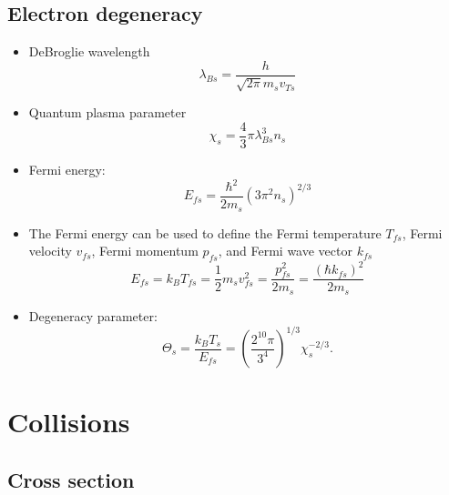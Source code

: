 \documentclass[a4paper,11pt]{report}
\begin{document}
\section{Electron degeneracy}

\begin{itemize}
    \item DeBroglie wavelength
    \begin{equation}
        \lambda_{Bs} = \dfrac{h}{\sqrt{2 \pi} m_s v_{Ts}}
    \end{equation}
    \item Quantum plasma parameter
    \begin{equation}
        \chi_s = \frac{4}{3} \pi \lambda_{Bs}^3 n_s
    \end{equation}
    
    \item Fermi energy:
    \begin{equation}
        E_{fs} = \frac{\hbar^2}{2m_s} \left ( 3 \pi^2 n_s \right)^{2/3}
    \end{equation}

    \item The Fermi energy can be used to define the Fermi temperature $T_{fs}$, Fermi velocity $v_{fs}$, Fermi momentum $p_{fs}$, and Fermi wave vector $k_{fs}$
    \begin{equation}
        E_{fs} = k_B T_{fs} = \frac{1}{2} m_s v_{fs}^2  = \frac{p_{fs}^2}{2m_s} = \frac{\left ( \hbar k_{fs} \right ) ^2}{2m_s}
    \end{equation}

    \item Degeneracy parameter:
    \begin{equation}
        \Theta_s = \frac{k_B T_s}{E_{fs}} = \left( \frac{2^{10} \pi}{3^4} \right)^{1/3} \chi_s^{-2/3}.
    \end{equation}
\end{itemize}

\chapter{Collisions}
\section{Cross section}
\end{document}
